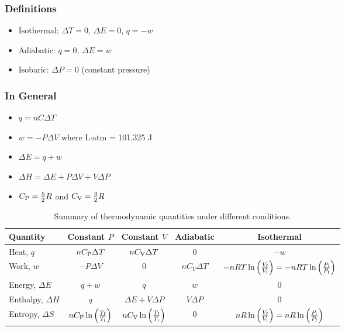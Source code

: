 \documentclass[10pt]{article}
\begin{document}
\subsubsection{Definitions}
\begin{itemize}
    \item Isothermal: $\Delta T = 0$, $\Delta E = 0$, $q = -w$
    \item Adiabatic: $q = 0$, $\Delta E = w$
    \item Isobaric: $\Delta P = 0$ (constant pressure)
\end{itemize}

\subsubsection{In General}
\begin{itemize}
    \item $q = nC\Delta T$
    \item $w = -P\Delta V$ where L$\cdot$atm = 101.325 J
    \item $\Delta E = q + w$
    \item $\Delta H = \Delta E + P\Delta V + V\Delta P$
    \item $C_\textnormal{P} = \frac{5}{2}R$ and $C_\textnormal{V} = \frac{3}{2}R$
\end{itemize}

\bigskip\begin{table}[H]
    \centering
    \caption{Summary of thermodynamic quantities under different conditions.}
        \begin{tabular}{lcccc}
            \toprule
            Quantity  & Constant $P$ & Constant $V$ & Adiabatic & Isothermal\\
            \midrule
            Heat, $q$    & $nC_\textnormal{P}\Delta T$ & $nC_\textnormal{V}\Delta T$ & 0 & $-w$ \\
            Work, $w$    & $-P\Delta V$ & 0 & $nC_V\Delta T$ & $-nRT\ln \left(\frac{V_\textnormal{f}}{V_\textnormal{i}}\right) = -nRT\ln \left(\frac{P_\textnormal{i}}{P_\textnormal{f}}\right)$ \\
            Energy, $\Delta E$ & $q+w$ & $q$ & $w$ & 0 \\
            Enthalpy, $\Delta H$ & $q$ & $\Delta E + V\Delta P$ & $V\Delta P$ & 0  \\
            Entropy, $\Delta S$ & $nC_\textnormal{P}\ln \left(\frac{T_\textnormal{f}}{T_\textnormal{i}}\right)$ &  $nC_\textnormal{V}\ln \left(\frac{T_\textnormal{f}}{T_\textnormal{i}}\right)$ & 0 & $nR\ln \left(\frac{V_\textnormal{f}}{V_\textnormal{i}}\right) = nR\ln \left(\frac{P_\textnormal{i}}{P_\textnormal{f}}\right)$ \\          
            \bottomrule
        \end{tabular}
    \label{cond}
\end{table}
\end{document}

